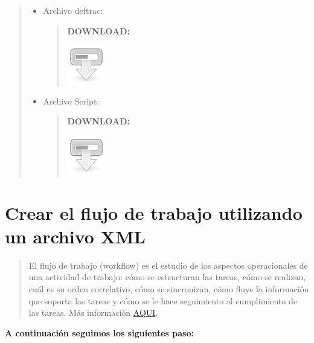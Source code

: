 \documentclass[letterpaper,11pt,spanish]{sphinxmanual}
\begin{document}
\begin{quote}
\begin{description}
\end{description}
\begin{itemize}
\item {} 
Archivo deftrac:
\begin{quote}

\textbf{DOWNLOAD:}

\includegraphics{download1.png}

\end{quote}

\item {} 
Archivo Script:
\begin{quote}

\textbf{DOWNLOAD:}

\includegraphics{download1.png}

\end{quote}

\end{itemize}
\end{quote}


\chapter{Crear el flujo de trabajo utilizando un archivo XML}
\label{_templates/Contenido6/Parte4:crear-el-flujo-de-trabajo-utilizando-un-archivo-xml}\label{_templates/Contenido6/Parte4::doc}\begin{quote}

El flujo de trabajo (workflow) es el estudio de los aspectos operacionales de una actividad de trabajo: cómo se estructuran las tareas, cómo se realizan, cuál es su orden correlativo, cómo se sincronizan, cómo fluye la información que soporta las tareas y cómo se le hace seguimiento al cumplimiento de las tareas. Más información \href{http://es.wikipedia.org/wiki/Flujo\_de\_trabajo}{AQUI}.
\end{quote}

\textbf{A continuación seguimos los siguientes paso:}
\end{document}
